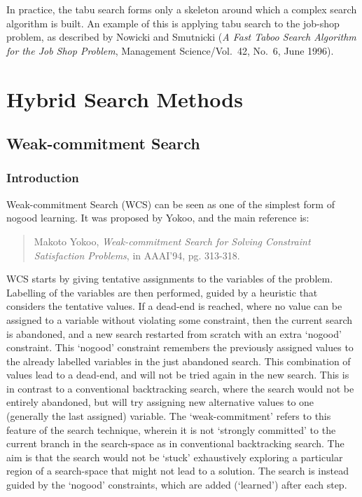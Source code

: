 In practice, the tabu search forms only a skeleton around which a complex
search algorithm is built. An example of this is applying tabu search to
the job-shop problem, as described by Nowicki and Smutnicki ({\it A Fast
Taboo Search Algorithm for the Job Shop Problem}, Management Science/Vol.\
42, No.\ 6, June 1996). 

\section{Hybrid Search Methods}

\subsection{Weak-commitment Search}
\subsubsection{Introduction}

Weak-commitment Search (WCS) can be seen as one of the simplest form of
nogood learning. It was proposed by Yokoo, and the main reference is:
\begin{quote}
Makoto Yokoo, {\it Weak-commitment Search for Solving Constraint Satisfaction
Problems}, in AAAI'94, pg. 313-318.
\end{quote}
WCS starts by giving tentative
assignments to the variables of the problem. Labelling of the variables are
then performed, guided by a heuristic that considers the tentative
values. If  a dead-end is reached,
where no value can be assigned to a variable without violating some
constraint, then the current search is abandoned, and a new search restarted
from scratch with an extra `nogood' constraint. This `nogood' constraint
remembers the previously assigned
values to the already labelled variables in the just abandoned search. This
combination of values lead to a dead-end, and will not be tried again in
the new search. This is in contrast to a conventional backtracking search,
where the search would not be entirely abandoned, but will try assigning
new alternative values to one (generally the last assigned) variable. The
`weak-commitment' refers to this feature of the search technique, wherein
it is not `strongly committed' to the current branch in the search-space as
in conventional backtracking search. The aim is that the search would not
be `stuck' exhaustively exploring a particular region of a search-space
that might not lead to a solution. The search is instead guided by the
`nogood' constraints, which are added (`learned') after each step.  

